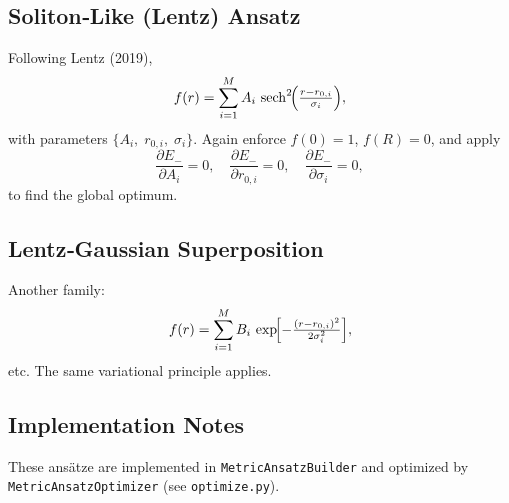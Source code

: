 \subsection{Soliton‐Like (Lentz) Ansatz}
Following Lentz (2019),
\[
  f(r) = \sum_{i=1}^M A_i \,\sech^2\!\Bigl(\tfrac{r - r_{0,i}}{\sigma_i}\Bigr),
\]
with parameters $\{A_i,\;r_{0,i},\;\sigma_i\}$.  Again enforce $f(0)=1$, $f(R)=0$, and apply
\[
  \frac{\partial E_{-}}{\partial A_i} = 0,\quad
  \frac{\partial E_{-}}{\partial r_{0,i}} = 0,\quad
  \frac{\partial E_{-}}{\partial \sigma_i} = 0,
\]
to find the global optimum.

\subsection{Lentz‐Gaussian Superposition}
Another family:
\[
  f(r) = \sum_{i=1}^M B_i\,\exp\!\Bigl[-\tfrac{(r - r_{0,i})^2}{2\sigma_i^2}\Bigr],
\]
etc.  The same variational principle applies.

\subsection{Implementation Notes}
These ansätze are implemented in \texttt{MetricAnsatzBuilder} and optimized by \texttt{MetricAnsatzOptimizer} (see \texttt{optimize.py}).
